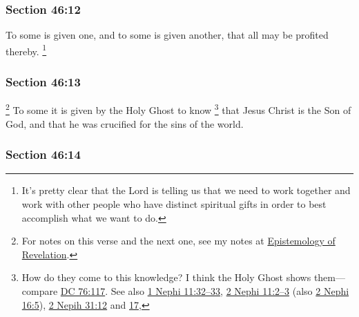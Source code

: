 	\subsubsection{Section 46:12} %
		\label{DC46-12}

		To some is given one, and to some is given another, that all may be profited thereby.%
			\footnote{%
				It's pretty clear that the Lord is telling us that we need to work together and work with other people who have distinct spiritual gifts in order to best accomplish what we want to do.
				}


	\subsubsection{Section 46:13} %
		\label{DC46-13}

			\footnote{%
				For notes on this verse and the next one, see my notes at \hyperref[EPIST-REVELATION-DC]{Epistemology of Revelation}.
				}%
		To some it is given by the Holy Ghost to know%
			\footnote{%
				How do they come to this knowledge? I think the Holy Ghost shows them---compare \hyperref[DC76-117]{DC 76:117}. See also \hyperref[1NEPHI-11-32]{1 Nephi 11:32--33}, \hyperref[2NEPHI-11-2]{2 Nephi 11:2--3} (also \hyperref[2NEPHI-16-5]{2 Nephi 16:5}), \hyperref[2NEPHI-31-12]{2 Nepih 31:12} and \hyperref[2NEPHI-31-17]{17}, 
				}
		that Jesus Christ is the Son of God, and that he was crucified for the sins of the world.


	\subsubsection{Section 46:14} %
		\label{DC46-14}

